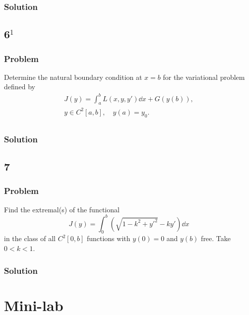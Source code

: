 \documentclass[12pt,twoside]{article}
\begin{document}
\subsubsection*{Solution}
\todo{}

\subsection{6$^1$}
\subsubsection*{Problem}
Determine the natural boundary condition at $x=b$ for the variational problem
defined by
\begin{equation}
  \begin{aligned}
    J(y) = \int_a^b L(x,y,y')\dd{x}+G(y(b)), \\
    y\in C^2[a,b],\quad y(a)=y_0. \\
  \end{aligned}
\end{equation}

\subsubsection*{Solution}
\todo{}

\subsection{7}
\subsubsection*{Problem}
Find the extremal{(s)} of the functional
\begin{equation}
  \label{eq:7-problem}
  J(y)=\int_0^b(\sqrt{1-k^2+y'^2}-ky') \dd{x}
\end{equation}
in the class of all $C^2[0,b]$ functions with $y(0)=0$ and $y(b)$ free. Take
$0<k<1$.

\subsubsection*{Solution}
\todo{}

\section{Mini-lab}
\end{document}
